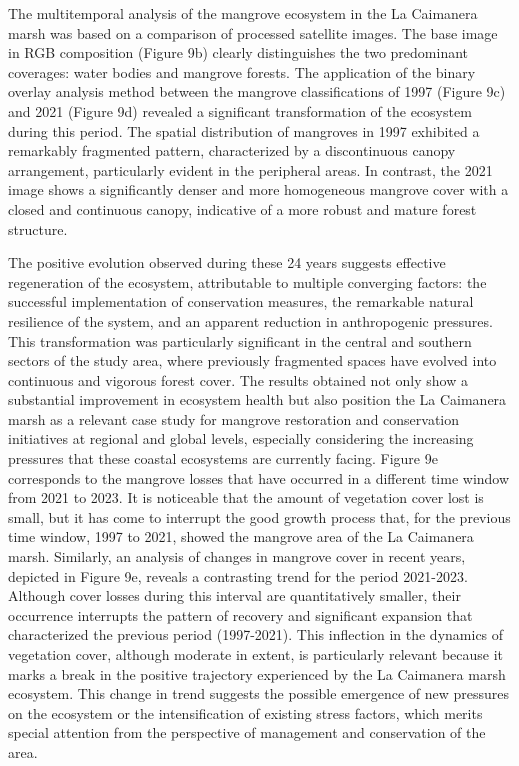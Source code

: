 \documentclass[10pt,a4paper,twocolumn]{article}
\begin{document}
The multitemporal analysis of the mangrove ecosystem in the La Caimanera marsh was based on a comparison of processed satellite images. The base image in RGB composition (Figure 9b) clearly distinguishes the two predominant coverages: water bodies and mangrove forests. The application of the binary overlay analysis method between the mangrove classifications of 1997 (Figure 9c) and 2021 (Figure 9d) revealed a significant transformation of the ecosystem during this period. The spatial distribution of mangroves in 1997 exhibited a remarkably fragmented pattern, characterized by a discontinuous canopy arrangement, particularly evident in the peripheral areas. In contrast, the 2021 image shows a significantly denser and more homogeneous mangrove cover with a closed and continuous canopy, indicative of a more robust and mature forest structure.

The positive evolution observed during these 24 years suggests effective regeneration of the ecosystem, attributable to multiple converging factors: the successful implementation of conservation measures, the remarkable natural resilience of the system, and an apparent reduction in anthropogenic pressures. This transformation was particularly significant in the central and southern sectors of the study area, where previously fragmented spaces have evolved into continuous and vigorous forest cover. The results obtained not only show a substantial improvement in ecosystem health but also position the La Caimanera marsh as a relevant case study for mangrove restoration and conservation initiatives at regional and global levels, especially considering the increasing pressures that these coastal ecosystems are currently facing. Figure 9e corresponds to the mangrove losses that have occurred in a different time window from 2021 to 2023. It is noticeable that the amount of vegetation cover lost is small, but it has come to interrupt the good growth process that, for the previous time window, 1997 to 2021, showed the mangrove area of the La Caimanera marsh. Similarly, an analysis of changes in mangrove cover in recent years, depicted in Figure 9e, reveals a contrasting trend for the period 2021-2023. Although cover losses during this interval are quantitatively smaller, their occurrence interrupts the pattern of recovery and significant expansion that characterized the previous period (1997-2021). This inflection in the dynamics of vegetation cover, although moderate in extent, is particularly relevant because it marks a break in the positive trajectory experienced by the La Caimanera marsh ecosystem. This change in trend suggests the possible emergence of new pressures on the ecosystem or the intensification of existing stress factors, which merits special attention from the perspective of management and conservation of the area.
\end{document}

